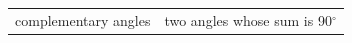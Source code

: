 {\begin{tabular}[t]{|l|l|l|}
     \tabularnewline\cline{1-1}\cline{2-2}\cline{3-3}
        complementary angles &
    \multicolumn{2}{c|}{two angles whose sum is 90${}^{\circ }$}
     \tabularnewline\cline{1-1}\cline{2-2}\cline{3-3}
    \end{tabular}} %
